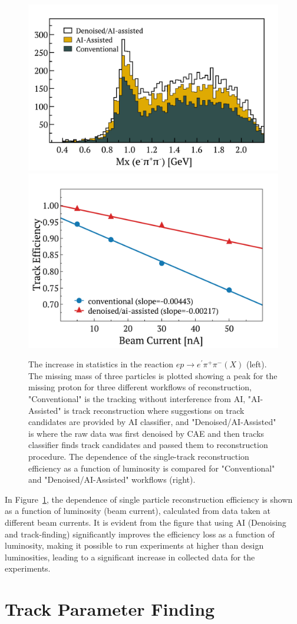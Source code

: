 \documentclass{webofc}
\begin{document}
\begin{figure}[h!]
\centering
\includegraphics[width=0.44\columnwidth]{images/figure_denoise_mxp.pdf}
\includegraphics[width=0.42\columnwidth]{images/luminosity_scan.pdf}
\caption{The increase in statistics in the reaction $ep\rightarrow e^\prime\pi^+\pi^-(X)$ (left). The missing mass of three particles is plotted showing a peak for the missing proton for
three different workflows of reconstruction, "Conventional" is the tracking without interference from AI, "AI-Assisted" is track reconstruction where suggestions on track candidates are provided by AI classifier, and "Denoised/AI-Assisted" is where the raw data was first denoised by CAE and then tracks classifier finds track candidates and passed them to reconstruction procedure.  The dependence of the single-track reconstruction efficiency as a function of luminosity is compared for "Conventional" and "Denoised/AI-Assisted" workflows (right). } 
\label{fig:ai_vs_conv}
\end{figure}

In Figure~\ref{fig:ai_vs_conv}, the dependence of single particle reconstruction efficiency is shown as a function of luminosity (beam current), calculated from data taken at different beam currents. It is evident from the figure that using AI (Denoising and track-finding) significantly improves the efficiency loss as a function of luminosity, making it possible to run experiments at higher than design luminosities, leading to a significant increase in collected data for the experiments.

\section{Track Parameter Finding}
\end{document}
